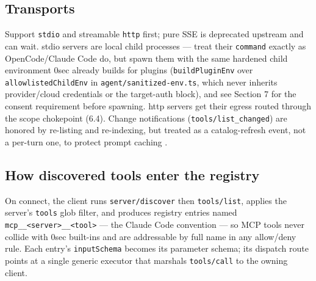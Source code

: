 \documentclass[11pt]{article}
\begin{document}
\subsection{Transports}

Support \texttt{stdio} and streamable \texttt{http} first; pure SSE is deprecated
upstream \cite{claudecode-mcp} and can wait. stdio servers are local child
processes --- treat their \texttt{command} exactly as OpenCode/Claude Code do,
but spawn them with the same hardened child environment 0sec already builds for
plugins (\texttt{buildPluginEnv} over \texttt{allowlistedChildEnv} in
\texttt{agent/sanitized-env.ts}, which never inherits provider/cloud credentials
or the target-auth block), and see Section 7 for the consent requirement before
spawning. http servers get
their egress routed through the scope chokepoint (6.4). Change notifications
(\texttt{tools/list\_changed}) are honored by re-listing and re-indexing, but
treated as a catalog-refresh event, not a per-turn one, to protect prompt
caching \cite{mcp-clientbp}.

\subsection{How discovered tools enter the registry}

On connect, the client runs \texttt{server/discover} then \texttt{tools/list},
applies the server's \texttt{tools} glob filter, and produces registry entries
named \texttt{mcp\_\_<server>\_\_<tool>} --- the Claude Code convention
\cite{claudecode-mcp} --- so MCP tools never collide with 0sec built-ins and are
addressable by full name in any allow/deny rule. Each entry's
\texttt{inputSchema} becomes its parameter schema; its dispatch route points at a
single generic executor that marshals \texttt{tools/call} to the owning client.
\end{document}
